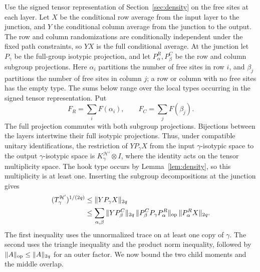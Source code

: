 Use the signed tensor representation of Section~\ref{sec:density} on the
free sites at each layer. Let \(X\) be the conditional row average from
the input layer to the junction, and \(Y\) the conditional column average
from the junction to the output. The row and column randomizations are
conditionally independent under the fixed path constraints, so \(YX\) is
the full conditional average. At the junction let \(P_\gamma\) be the
full-group isotypic projection, and let \(P_\alpha^R,P_\beta^C\) be the
row and column subgroup projections. Here \(\alpha_i\) partitions the
number of free sites in row \(i\), and \(\beta_j\) partitions the number
of free sites in column \(j\); a row or column with no free sites has the
empty type. The sums below range over the local types occurring in the
signed tensor representation. Put
\[
 F_R=\sum_iF(\alpha_i),\qquad F_C=\sum_jF(\beta_j).
\]
The full projection commutes with both subgroup projections. Bijections
between the layers intertwine their full isotypic projections. Thus,
under compatible unitary identifications, the restriction of
\(Y P_\gamma X\) from the input \(\gamma\)-isotypic space to the output
\(\gamma\)-isotypic space is \(K_\gamma^{\mathcal H'}\otimes I\), where
the identity acts on the tensor multiplicity space. The hook type occurs
by Lemma~\ref{lem:density}, so this multiplicity is at least one.
Inserting the subgroup decompositions at the junction gives
\begin{equation}
\begin{aligned}
 (T_\gamma^{\mathcal H'})^{1/(2q)}
 &\le\|Y P_\gamma X\|_{2q}\\
 &\le\sum_{\alpha,\beta}
  \|Y P_\beta^C\|_{2q}\,
  \|P_\beta^C P_\gamma P_\alpha^R\|_{\rm op}\,
  \|P_\alpha^R X\|_{2q}.
\end{aligned}
\label{ac:eq:20}
\end{equation}
The first inequality uses the unnormalized trace on at least one copy of
\(\gamma\). The second uses the triangle inequality and the product norm
inequality, followed by \(\|A\|_{\rm op}\le\|A\|_{2q}\) for an outer
factor. We now bound the two child moments and the middle overlap.

